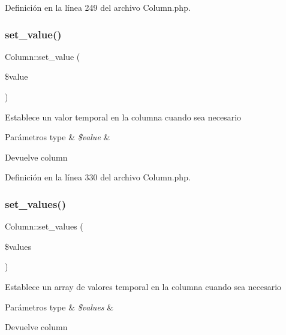 Definición en la línea 249 del archivo Column.\+php.

\mbox{\label{class_column_a156be29aa2b09b0685b54e4eb273e98f}} 
\subsubsection{\texorpdfstring{set\_value()}{set\_value()}}
{\footnotesize\ttfamily Column\+::set\+\_\+value (\begin{DoxyParamCaption}\item[{}]{\$value }\end{DoxyParamCaption})}

Establece un valor temporal en la columna cuando sea necesario


\begin{DoxyParams}[1]{Parámetros}
type & {\em \$value} & \\
\hline
\end{DoxyParams}
\begin{DoxyReturn}{Devuelve}
column 
\end{DoxyReturn}


Definición en la línea 330 del archivo Column.\+php.

\mbox{\label{class_column_ae867869393b7a30d7a41490497544c81}} 
\subsubsection{\texorpdfstring{set\_values()}{set\_values()}}
{\footnotesize\ttfamily Column\+::set\+\_\+values (\begin{DoxyParamCaption}\item[{}]{\$values }\end{DoxyParamCaption})}

Establece un array de valores temporal en la columna cuando sea necesario


\begin{DoxyParams}[1]{Parámetros}
type & {\em \$values} & \\
\hline
\end{DoxyParams}
\begin{DoxyReturn}{Devuelve}
column 
\end{DoxyReturn}


